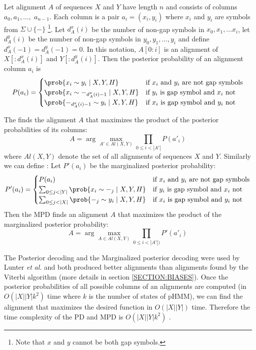 Let alignment $A$ of sequences $X$ and $Y$ have length $n$ and
consists of columns $a_0,a_1,\dots,$ $a_{n-1}$. Each column is a pair
$a_i=(x_i,y_i)$ where $x_i$ and $y_i$ are symbols from $\Sigma\cup\{-\}$ \footnote{Note that $x$ and $y$ cannot be both gap symbols.}.
Let $d_A^x(i)$ be the number of non-gap symbols in $x_0,x_1,\dots x_{i}$,
let $d_A^y(i)$ be the number of non-gap symbols in $y_0,y_1,\dots, y_{i}$ and
define $d_A^x(-1)=d_A^y(-1)=0$. In this notation, $A[0:i]$ is an alignment of $X[:d_A^x(i)]$ 
and $Y[:d_A^y(i)]$. Then the posterior probability of an alignment column $a_i$ is
\[P(a_i)=
\begin{cases}
\prob{x_i\sim y_i\mid X,Y,H} & \text{if $x_i$ and $y_i$ are not gap symbols}\\
\prob{x_i\sim -_{d_A^y(i)-1}\mid X,Y,H}  & \text{if $y_i$ is gap symbol and $x_i$ not}\\
\prob{-_{d_A^x(i)-1}\sim y_i\mid X,Y,H}  & \text{if $x_i$ is gap symbol and $y_i$ not}
\end{cases}
\]

The  finds the alignment $A$ that maximizes
the product of the posterior probabilities of its columns: 
\[A = \arg\max_{A'\in Al(X,Y)}\prod_{0\leq i <
|A'|}P(a'_i)\] where $Al(X,Y)$ denote the set of all  alignments of sequences
$X$ and $Y$. Similarly we can define : Let $P'(a_i)$ be the marginalized posterior probability:
\[
P'(a_i) = \begin{cases}
P(a_i) & \text{if $x_i$ and $y_i$ are not gap symbols}\\
\sum_{0\leq j < |Y|}\prob{x_i\sim -_{j}\mid X,Y,H}  & \text{if $y_i$ is gap symbol and $x_i$ not}\\
\sum_{0\leq j < |X|} \prob{-_{j}\sim y_i\mid X,Y,H}  & \text{if $x_i$ is gap symbol and $y_i$ not}
\end{cases}
\]
Then the MPD finds an alignment $A$ that maximizes the product of the
marginalized posterior probability:
\[A = \arg\max_{A\in Al(X,Y)}\prod_{0\leq i < |A'|)}P'(a'_i)\] 

The Posterior decoding and the Marginalized posterior decoding were used by
Lunter {\it et al.} and both produced better alignments than alignments found
by the Viterbi algorithm (more details in section \ref{SECTION:BIASES}). Once
the posterior probabilities of all possible columns of an
alignments are computed (in $O(|X||Y|k^2)$ time where $k$ is the number of
states of pHMM), we can find the alignment that maximizes the desired
function in $O(|X||Y|)$ time. Therefore the time complexity of the PD and MPD is 
$O(|X||Y|k^2)$ \cite{Lunter2008}. 

